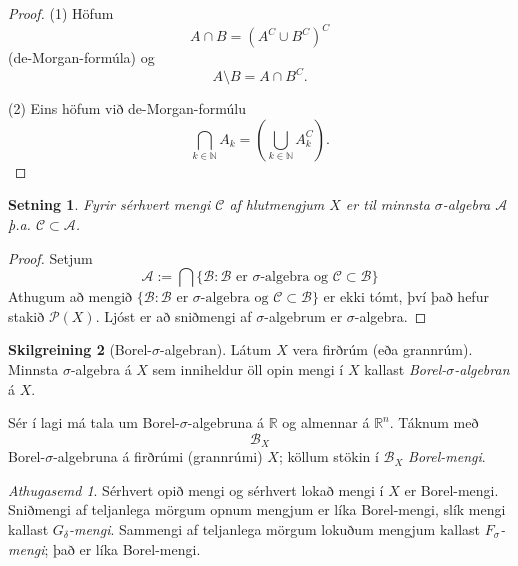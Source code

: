 \documentclass[a4paper,icelandic,11pt]{book}
\theoremstyle{plain}      \newtheorem{setn}{Setning}[chapter]
\theoremstyle{definition} \newtheorem{skilgr}[setn]{Skilgreining}
\theoremstyle{remark}     \newtheorem*{ath}{Athugasemd}
\newcommand{\R}{\mathbb R}
\newcommand{\N}{\mathbb N}
\begin{document}
\begin{proof}
  (1) Höfum
  \[
  A\cap B = (A^{C}\cup B^{C})^{C}
  \]
  (de-Morgan-formúla) og
  \[
  A\setminus B = A\cap B^{C}.
  \]
  
  (2) Eins höfum við de-Morgan-formúlu
  \[
  \bigcap_{k\in\N} A_{k} = \left(\bigcup_{k\in\N} A_{k}^{C}\right).
  \]
\end{proof}
\begin{setn}
  Fyrir sérhvert mengi $\mathcal C$ af hlutmengjum $X$ er til
  \emph{minnsta} $\sigma$-algebra $\mathcal A$
  þ.a. $\mathcal{C}\subset\mathcal{A}$.
\end{setn}
\begin{proof}
  Setjum
  \[
  \mathcal A
  := \bigcap \{
    \mathcal B : 
      \text{$\mathcal B$ er $\sigma$-algebra og $\mathcal C\subset \mathcal B$} 
    \}
  \]
  Athugum að mengið $\{ \mathcal B : \text{$\mathcal B$ er
    $\sigma$-algebra og $\mathcal C\subset \mathcal B$} \}$ er ekki
  tómt, því það hefur stakið $\mathcal P(X)$. Ljóst er að sniðmengi af
  $\sigma$-algebrum er $\sigma$-algebra.
\end{proof}
\begin{skilgr}[Borel-$\sigma$-algebran]
  
  Látum $X$ vera firðrúm (eða grannrúm). Minnsta $\sigma$-algebra á
  $X$ sem inniheldur öll opin mengi í $X$ kallast
  \emph{Borel-$\sigma$-algebran} á $X$.
\end{skilgr}
Sér í lagi má tala um Borel-$\sigma$-algebruna á $\R$ og almennar á
$\R^{n}$.
Táknum með
\[
\mathcal B_{X}
\]
Borel-$\sigma$-algebruna á firðrúmi
(grannrúmi) $X$; köllum stökin í $\mathcal B_{X}$
\emph{Borel-mengi}.
\begin{ath}
  Sérhvert opið mengi og sérhvert lokað mengi í $X$ er Borel-mengi.
  Sniðmengi af teljanlega mörgum opnum mengjum er líka Borel-mengi,
  slík mengi kallast
  \emph{$G_{\delta}$-mengi}. Sammengi
  af teljanlega mörgum lokuðum mengjum kallast
  \emph{$F_{\sigma}$-mengi};
  það er líka Borel-mengi.
\end{ath}
\end{document}
